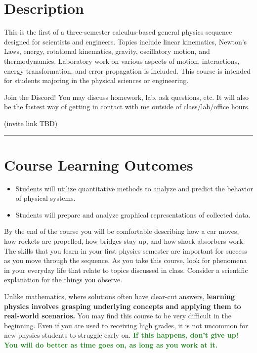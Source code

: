 \documentclass[12pt]{article}
\begin{document}
\section*{Description}
This is the first of a three-semester calculus-based general physics sequence designed for scientists and engineers. 
Topics include linear kinematics, Newton's Laws, energy, rotational kinematics, gravity, oscillatory motion, and thermodynamics. 
Laboratory work on various aspects of motion, interactions, energy transformation, and error propagation is included. 
This course is intended for students majoring in the physical sciences or engineering.

\bigskip
\noindent
Join the Discord!
You may discuss homework, lab, ask questions, etc.
It will also be the fastest way of getting in contact with me outside of class/lab/office hours.

\medskip

\noindent
(invite link TBD)

\medskip
\hrule

\section*{Course Learning Outcomes}
\begin{itemize}[leftmargin=2em]
  \item Students will utilize quantitative methods to analyze and predict the behavior of physical systems.
  \item Students will prepare and analyze graphical representations of collected data.
\end{itemize}

By the end of the course you will be comfortable describing how a car moves, how rockets are propelled, how bridges stay up, and how shock absorbers work. 
The skills that you learn in your first physics semester are important for success as you move through the sequence. 
As you take this course, look for phenomena in your everyday life that relate to topics discussed in class. 
Consider a scientific explanation for the things you observe.

Unlike mathematics, where solutions often have clear-cut answers, \textbf{learning physics involves grasping underlying concepts and applying them to real-world scenarios.} You may find this course to be very difficult in the beginning. 
Even if you are used to receiving high grades, it is not uncommon for new physics students to struggle early on. 
\textbf{\textcolor{ForestGreen}{
If this happens, don’t give up! You will do better as time goes on, as long as you work at it.
}}
\end{document}
